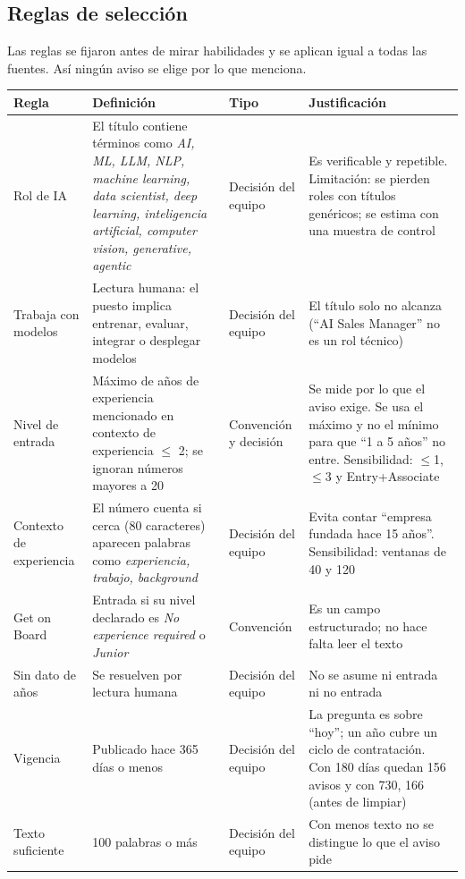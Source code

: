 \documentclass[11pt,a4paper]{article}
\renewcommand{\le}{\ensuremath{\leq}}
\begin{document}
\subsection{Reglas de selección}\label{sec:reglas}
Las reglas se fijaron antes de mirar habilidades y se aplican igual a todas las fuentes. Así ningún aviso se elige por lo que menciona.

\begin{table}[H]
\centering\small
\begin{tabularx}{\textwidth}{L{2.7cm} L{4.6cm} L{2.2cm} X}
\toprule
{}\textbf{Regla} & \textbf{Definición} & \textbf{Tipo} & \textbf{Justificación}\\
\midrule
Rol de IA & El título contiene términos como \emph{AI, ML, LLM, NLP, machine learning, data scientist, deep learning, inteligencia artificial, computer vision, generative, agentic} & Decisión del equipo & Es verificable y repetible. Limitación: se pierden roles con títulos genéricos; se estima con una muestra de control\\
Trabaja con modelos & Lectura humana: el puesto implica entrenar, evaluar, integrar o desplegar modelos & Decisión del equipo & El título solo no alcanza (``AI Sales Manager'' no es un rol técnico)\\
Nivel de entrada & Máximo de años de experiencia mencionado en contexto de experiencia \le{} 2; se ignoran números mayores a 20 & Convención y decisión & Se mide por lo que el aviso exige. Se usa el máximo y no el mínimo para que ``1 a 5 años'' no entre. Sensibilidad: \le{}1, \le{}3 y Entry+Associate\\
Contexto de experiencia & El número cuenta si cerca (80 caracteres) aparecen palabras como \emph{experiencia, trabajo, background} & Decisión del equipo & Evita contar ``empresa fundada hace 15 años''. Sensibilidad: ventanas de 40 y 120\\
Get on Board & Entrada si su nivel declarado es \emph{No experience required} o \emph{Junior} & Convención & Es un campo estructurado; no hace falta leer el texto\\
Sin dato de años & Se resuelven por lectura humana & Decisión del equipo & No se asume ni entrada ni no entrada\\
Vigencia & Publicado hace 365 días o menos & Decisión del equipo & La pregunta es sobre ``hoy''; un año cubre un ciclo de contratación. Con 180 días quedan 156 avisos y con 730, 166 (antes de limpiar)\\
Texto suficiente & 100 palabras o más & Decisión del equipo & Con menos texto no se distingue lo que el aviso pide\\

\end{tabularx}
\end{table}
\end{document}
